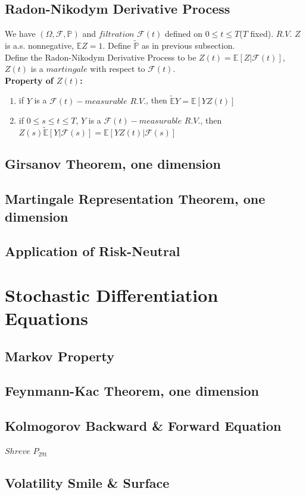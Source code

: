 \documentclass[a4paper, 12pt]{article}
\begin{document}
\subsection{Radon-Nikodym Derivative Process}
We have $(\Omega, \mathcal{F}, \mathbb{P})$ and $filtration$ $\mathcal{F}(t)$ defined on $0 \leq t \leq T$($T$ fixed). $R.V.$ $Z$ is a.s. nonnegative, $\mathbb{E}Z = 1$. Define $\widetilde{\mathbb{P}}$ as in previous subsection.\\
\indent Define the Radon-Nikodym Derivative Process to be $Z(t) = \mathbb{E}[Z|\mathcal{F}(t)]$, $Z(t)$ is a $martingale$ with respect to $\mathcal{F}(t)$.\\
\textbf{Property of $Z(t)$: }
\begin{enumerate}
	\item if $Y$ is a $\mathcal{F}(t)-measurable$ $R.V.$, then $\widetilde{\mathbb{E}}Y = \mathbb{E}[YZ(t)]$
	\item if $0 \leq s \leq t \leq T$, $Y$ is a $\mathcal{F}(t)-measurable$ $R.V.$, then \\$Z(s) \widetilde{\mathbb{E}}[Y|\mathcal{F}(s)] = \mathbb{E}[YZ(t)|\mathcal{F}(s)]$
\end{enumerate}

\subsection{Girsanov Theorem, one dimension}

\subsection{Martingale Representation Theorem, one dimension}

\subsection{Application of Risk-Neutral}

\section{Stochastic Differentiation Equations}

\subsection{Markov Property}

\subsection{Feynmann-Kac Theorem, one dimension}

\subsection{Kolmogorov Backward \& Forward Equation}
$Shreve$ $P_{291}$

\subsection{Volatility Smile \& Surface}
\end{document}
